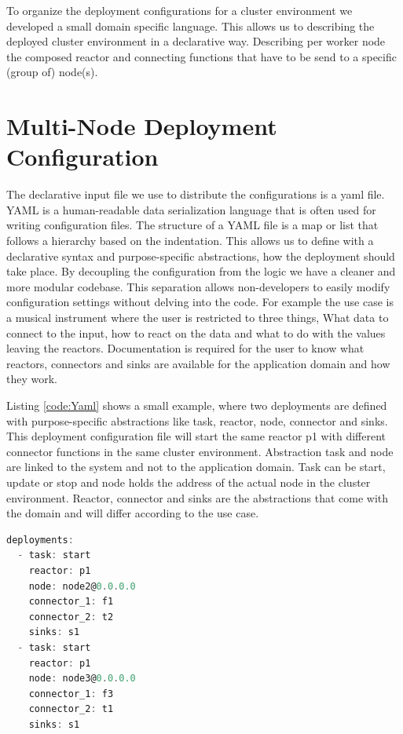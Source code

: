 \documentclass[a4paper]{book}
\begin{document}
To organize the deployment configurations for a cluster environment we developed a small domain specific language. This allows us to describing the deployed cluster environment in a declarative way. Describing per worker node the composed reactor and connecting functions that have to be send to a specific (group of) node(s).

\section{Multi-Node Deployment Configuration}
The declarative input file we use to distribute the configurations is a yaml file. YAML is a human-readable data serialization language that is often used for writing configuration files. The structure of a YAML file is a map or list that follows a hierarchy based on the indentation. This allows us to define with a declarative syntax and purpose-specific abstractions, how the deployment should take place. By decoupling the configuration from the logic we have a cleaner and more modular codebase. This separation allows non-developers to easily modify configuration settings without delving into the code. For example the use case is a musical instrument where the user is restricted to three things, What data to connect to the input, how to react on the data and what to do with the values leaving the reactors. Documentation is required for the user to know what reactors, connectors and sinks are available for the application domain and how they work.

Listing \ref{code:Yaml} shows a small example, where two deployments are defined with purpose-specific abstractions like task, reactor, node, connector and sinks. This deployment configuration file will start the same reactor p1 with different connector functions in the same cluster environment. Abstraction task and node are linked to the system and not to the application domain. Task can be start, update or stop and node holds the address of the actual node in the cluster environment. Reactor, connector and sinks are the abstractions that come with the domain and will differ according to the use case. 


\begin{lstlisting}[language=C, caption={YAML code}, captionpos=b,label={code:Yaml}, basicstyle=\ttfamily, frame=single]
deployments:
  - task: start
    reactor: p1
    node: node2@0.0.0.0
    connector_1: f1
    connector_2: t2
    sinks: s1
  - task: start
    reactor: p1
    node: node3@0.0.0.0
    connector_1: f3
    connector_2: t1
    sinks: s1
\end{lstlisting}
\end{document}
